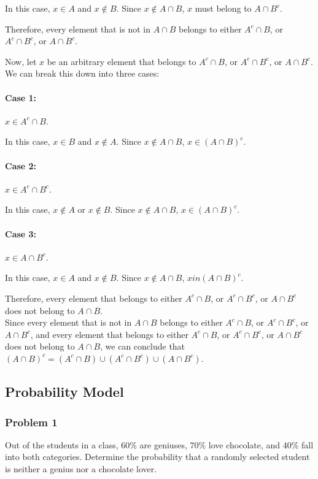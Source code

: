 In this case, $x \in A$ and $x \not \in B$. Since $x \not \in A \cap B$, $x$ must belong to $A \cap B^c$.

Therefore, every element that is not in $A \cap B$ belongs to either $A^c \cap B$, or $A^c \cap B^c$, or $A \cap B^c$.

Now, let $x$ be an arbitrary element that belongs to $A^c \cap B$, or $A^c \cap B^c$, or $A \cap B^c$.
We can break this down into three cases:

\paragraph{Case 1:} $x \in A^c \cap B$.

In this case, $x \in B$ and $x \not \in A$.
Since $x \not \in A \cap B$, $x \in (A \cap B)^c$.

\paragraph{Case 2:} $x \in A^c \cap B^c$.

In this case, $x \not \in A$ or $x \not \in B$. Since $x \not \in A \cap B$, $x \in (A \cap B)^c$.

\paragraph{Case 3:} $x \in A \cap B^c$.

In this case, $x \in A$ and $x \not \in B$. Since $x \not \in A \cap B$, $x in (A \cap B)^c$.

Therefore, every element that belongs to either $A^c \cap B$, or $A^c \cap B^c$,
or $A \cap B^c$ does not belong to $A \cap B$.\\

Since every element that is not in $A \cap B$ belongs to either $A^c \cap B$, or $A^c \cap B^c$,
or $A \cap B^c$, and every element that belongs to either $A^c \cap B$,
or $A^c \cap B^c$, or $A \cap B^c$ does not belong to $A \cap B$,
we can conclude that $(A\cap B)^c =(A^c \cap B)\cup(A^c \cap B^c)\cup(A\cap B^c)$.

\newpage
\subsection{Probability Model}
\subsubsection{Problem 1} Out of the students in a class, 60\% are geniuses, 70\% love chocolate, and 40\% fall into both categories. Determine the probability that a randomly selected student is neither a genius nor a chocolate lover.
